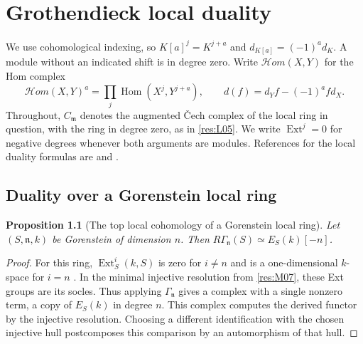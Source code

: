 \documentclass[11pt,oneside,openany]{book}
\newtheorem{proposition}[theorem]{Proposition}
\theoremstyle{definition}
\theoremstyle{remark}
\begin{document}
\chapter{Grothendieck local duality}\label{ch:local-duality}

We use cohomological indexing, so $K[a]^j=K^{j+a}$ and
$d_{K[a]}=(-1)^a d_K$. A module without an indicated shift is
in degree zero. Write $\mathcal H om(X,Y)$ for the Hom complex
\[
 \mathcal H om(X,Y)^a=\prod_j\operatorname{Hom}(X^j,Y^{j+a}),
 \qquad d(f)=d_Y f-(-1)^a f d_X .
\]
Throughout, $C_{\mathfrak m}$ denotes the augmented \v{C}ech
complex of the local ring in question, with the ring in degree
zero, as in \ref{res:L05}. We write $\operatorname{Ext}^j=0$ for
negative degrees whenever both arguments are modules. References
for the local duality formulas are \cite[Sections 18--22]{st-dual}
and \cite[Section 3.5]{bruns}.

\section{Duality over a Gorenstein local ring}

\begin{proposition}[The top local cohomology of a Gorenstein local ring]\label{res:D01}
Let $(S,\mathfrak n,k)$ be Gorenstein of dimension $n$. Then
$R\Gamma_{\mathfrak n}(S)\simeq E_S(k)[-n]$.
\end{proposition}
\begin{proof}
For this ring, $\operatorname{Ext}^i_S(k,S)$ is zero for $i\ne n$
and is a one-dimensional $k$-space for $i=n$
\cite[GC-06]{core}. In the minimal injective resolution from
\ref{res:M07}, these Ext groups are its socles. Thus applying
$\Gamma_{\mathfrak n}$ gives a complex with a single nonzero term,
a copy of $E_S(k)$ in degree $n$. This complex computes the derived
functor by the injective resolution. Choosing a different
identification with the chosen injective hull postcomposes this
comparison by an automorphism of that hull.
\end{proof}
\end{document}
